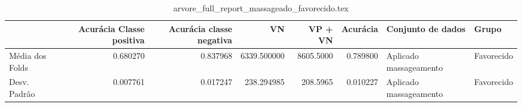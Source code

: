 \begin{table}
\centering
\caption{arvore_full_report_massageado_favorecido.tex}
\label{arvore_full_report_massageado_favorecido.tex}
\begin{tabular}{lrrrrrll}
\toprule
{}               &  Acurácia Classe positiva &  Acurácia classe negativa &          VN  &   VP + VN  &  Acurácia &       Conjunto de dados &       Grupo \\
\midrule
Média dos Folds &                  0.680270 &                  0.837968 &  6339.500000 &  8605.5000 &  0.789800 &  Aplicado massageamento &  Favorecido \\
Desv. Padrão    &                  0.007761 &                  0.017247 &   238.294985 &   208.5965 &  0.010227 &  Aplicado massageamento &  Favorecido \\
\bottomrule
\end{tabular}
\end{table}
